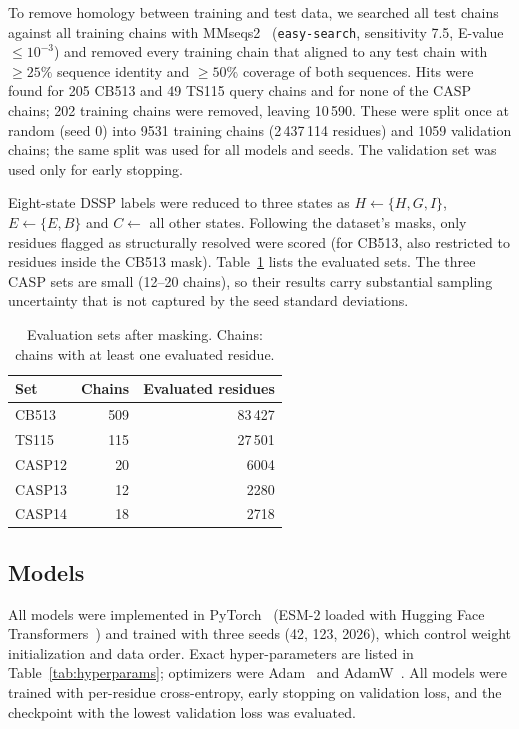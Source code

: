 \documentclass[preprint,12pt,authoryear]{elsarticle}
\begin{document}
To remove homology between training and test data, we searched all test chains against all training chains with MMseqs2~\citep{steinegger2017mmseqs2} (\texttt{easy-search}, sensitivity 7.5, E-value $\leq 10^{-3}$) and removed every training chain that aligned to any test chain with $\geq 25\%$ sequence identity and $\geq 50\%$ coverage of both sequences. Hits were found for 205 CB513 and 49 TS115 query chains and for none of the CASP chains; 202 training chains were removed, leaving 10\,590. These were split once at random (seed 0) into 9531 training chains (2\,437\,114 residues) and 1059 validation chains; the same split was used for all models and seeds. The validation set was used only for early stopping.

Eight-state DSSP labels were reduced to three states as $H \leftarrow \{H,G,I\}$, $E \leftarrow \{E,B\}$ and $C \leftarrow$ all other states. Following the dataset's masks, only residues flagged as structurally resolved were scored (for CB513, also restricted to residues inside the CB513 mask). Table~\ref{tab:data} lists the evaluated sets. The three CASP sets are small (12--20 chains), so their results carry substantial sampling uncertainty that is not captured by the seed standard deviations.

\begin{table}[htbp]
\centering
\small
\caption{Evaluation sets after masking. Chains: chains with at least one evaluated residue.}
\label{tab:data}
\begin{tabular}{lrr}
\toprule
\textbf{Set} & \textbf{Chains} & \textbf{Evaluated residues} \\
\midrule
CB513  & 509 & 83\,427 \\
TS115  & 115 & 27\,501 \\
CASP12 & 20  & 6004 \\
CASP13 & 12  & 2280 \\
CASP14 & 18  & 2718 \\
\bottomrule
\end{tabular}
\end{table}

\subsection{Models}
All models were implemented in PyTorch~\citep{paszke2019pytorch} (ESM-2 loaded with Hugging Face Transformers~\citep{wolf2020transformers}) and trained with three seeds (42, 123, 2026), which control weight initialization and data order. Exact hyper-parameters are listed in Table~\ref{tab:hyperparams}; optimizers were Adam~\citep{kingma2014adam} and AdamW~\citep{loshchilov2017decoupled}. All models were trained with per-residue cross-entropy, early stopping on validation loss, and the checkpoint with the lowest validation loss was evaluated.
\end{document}
